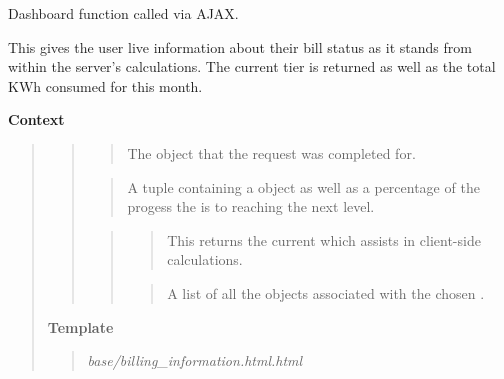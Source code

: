 \documentclass[letterpaper,10pt,english]{sphinxmanual}
\begin{document}
\begin{fulllineitems}
\label{modules/webapp:webapp.views.billing_information}
Dashboard function called via AJAX.

This gives the user live information about their bill status
as it stands from within the server's calculations. The current
tier is returned as well as the total KWh consumed for this month.

\textbf{Context}
\begin{quote}
\begin{quote}

\begin{quote}

The {\hyperref[modules/microdata:microdata.models.Device]{\emph{}}} object that the
request was completed for.
\end{quote}

\begin{quote}

A tuple containing a {\hyperref[modules/microdata:microdata.models.Device]{\emph{}}}
object as well as a percentage of the progess the
{\hyperref[modules/microdata:microdata.models.Device]{\emph{}}} is to reaching the next
{\hyperref[modules/webapp:webapp.models.Tier]{\emph{}}} level.
\end{quote}

\begin{quote}
\begin{quote}

This returns the current {\hyperref[modules/webapp:webapp.models.Territory]{\emph{}}}
which assists in client-side calculations.
\end{quote}

\begin{quote}

A list of all the {\hyperref[modules/webapp:webapp.models.Tier]{\emph{}}} objects
associated with the chosen {\hyperref[modules/webapp:webapp.models.RatePlan]{\emph{}}}.
\end{quote}
\end{quote}
\end{quote}

\textbf{Template}
\begin{quote}

\emph{base/billing\_information.html.html}
\end{quote}
\end{quote}

\end{fulllineitems}
\end{document}
